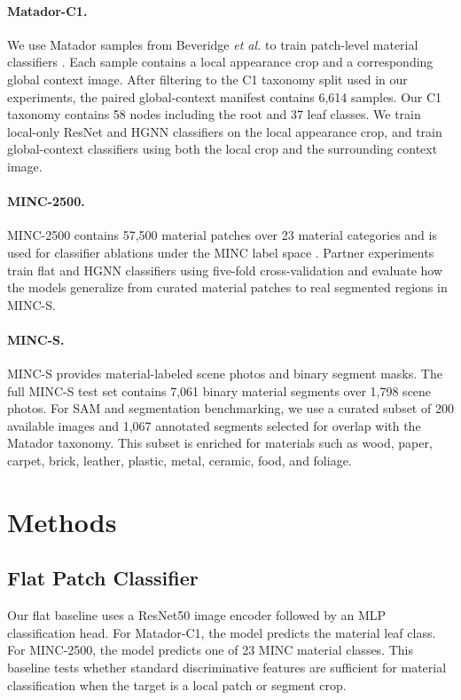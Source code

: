 \documentclass[11pt,twocolumn,letterpaper]{article}
\begin{document}
\paragraph{Matador-C1.}
We use Matador samples from Beveridge \textit{et al.} to train patch-level material classifiers \cite{beveridge2025}. Each sample contains a local appearance crop and a corresponding global context image. After filtering to the C1 taxonomy split used in our experiments, the paired global-context manifest contains 6,614 samples. Our C1 taxonomy contains 58 nodes including the root and 37 leaf classes. We train local-only ResNet and HGNN classifiers on the local appearance crop, and train global-context classifiers using both the local crop and the surrounding context image.

\paragraph{MINC-2500.}
MINC-2500 contains 57,500 material patches over 23 material categories and is used for classifier ablations under the MINC label space \cite{bell2015}. Partner experiments train flat and HGNN classifiers using five-fold cross-validation and evaluate how the models generalize from curated material patches to real segmented regions in MINC-S.

\paragraph{MINC-S.}
MINC-S provides material-labeled scene photos and binary segment masks. The full MINC-S test set contains 7,061 binary material segments over 1,798 scene photos. For SAM and segmentation benchmarking, we use a curated subset of 200 available images and 1,067 annotated segments selected for overlap with the Matador taxonomy. This subset is enriched for materials such as wood, paper, carpet, brick, leather, plastic, metal, ceramic, food, and foliage.

\section{Methods}

\subsection{Flat Patch Classifier}

Our flat baseline uses a ResNet50 image encoder followed by an MLP classification head. For Matador-C1, the model predicts the material leaf class. For MINC-2500, the model predicts one of 23 MINC material classes. This baseline tests whether standard discriminative features are sufficient for material classification when the target is a local patch or segment crop.
\end{document}
